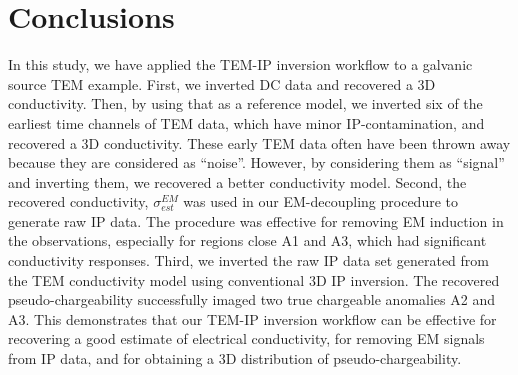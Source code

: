 \documentclass[paper]{geophysics}
\begin{document}
\section{Conclusions}
In this study, we have applied the TEM-IP inversion workflow to a galvanic source TEM example. First, we inverted DC data and recovered a 3D conductivity. Then, by using that as a reference model, we inverted six of the earliest time channels of TEM data, which have minor IP-contamination, and recovered a 3D conductivity. These early TEM data often have been thrown away because they are considered as ``noise''. However, by considering them as ``signal'' and inverting them, we recovered a better conductivity model. Second, the recovered conductivity, $\sigma^{EM}_{est}$ was used in our EM-decoupling procedure to generate raw IP data. The procedure was effective for removing EM induction in the observations, especially for regions close A1 and A3, which had significant conductivity responses. Third, we inverted the raw IP data set generated from the TEM conductivity model using conventional 3D IP inversion. The recovered pseudo-chargeability successfully imaged two true chargeable anomalies A2 and A3. This demonstrates that our TEM-IP inversion workflow can be effective for recovering a good estimate of electrical conductivity, for removing EM signals from IP data, and for obtaining a 3D distribution of pseudo-chargeability.


\end{document}
